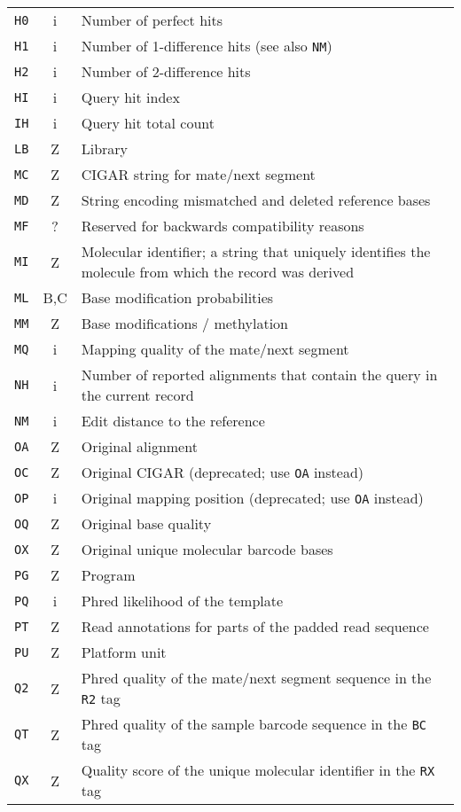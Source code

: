 \documentclass[10pt]{article}
\begin{document}
\begin{center}
\begin{longtable}{ccp{12.5cm}}
  {\tt H0} & i & Number of perfect hits \\
  {\tt H1} & i & Number of 1-difference hits (see also {\tt NM}) \\
  {\tt H2} & i & Number of 2-difference hits \\
  {\tt HI} & i & Query hit index \\
  {\tt IH} & i & Query hit total count \\
  {\tt LB} & Z & Library \\
  {\tt MC} & Z & CIGAR string for mate/next segment \\
  {\tt MD} & Z & String encoding mismatched and deleted reference bases \\
  {\tt MF} & ? & Reserved for backwards compatibility reasons \\
  {\tt MI} & Z & Molecular identifier; a string that uniquely identifies the molecule from which the record was derived \\
  {\tt ML} & B,C & Base modification probabilities \\
  {\tt MM} & Z & Base modifications / methylation  \\
  {\tt MQ} & i & Mapping quality of the mate/next segment \\
  {\tt NH} & i & Number of reported alignments that contain the query in the current record \\
  {\tt NM} & i & Edit distance to the reference \\
  {\tt OA} & Z & Original alignment \\
  {\tt OC} & Z & Original CIGAR (deprecated; use {\tt OA} instead) \\
  {\tt OP} & i & Original mapping position (deprecated; use {\tt OA} instead) \\
  {\tt OQ} & Z & Original base quality \\
  {\tt OX} & Z & Original unique molecular barcode bases \\
  {\tt PG} & Z & Program \\
  {\tt PQ} & i & Phred likelihood of the template \\
  {\tt PT} & Z & Read annotations for parts of the padded read sequence \\
  {\tt PU} & Z & Platform unit \\
  {\tt Q2} & Z & Phred quality of the mate/next segment sequence in the {\tt R2} tag \\
  {\tt QT} & Z & Phred quality of the sample barcode sequence in the {\tt BC} tag \\
  {\tt QX} & Z & Quality score of the unique molecular identifier in the {\tt RX} tag \\

\end{longtable}
\end{center}
\end{document}
